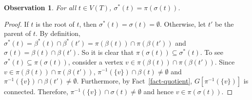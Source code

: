 \documentclass[a4paper,11pt]{article}
\numberwithin{lemma}{section}
\newtheorem{observation}[lemma]{Observation}
\begin{document}
\begin{observation} \label{obs-adhesion}
For all $t \in V(T)$, $\sigma^*(t) = \pi(\sigma(t))$.
\end{observation}
\begin{proof}
If $t$ is the root of $t$, then $\sigma^*(t) = \sigma(t) = \emptyset$.
Otherwise, let $t'$ be the parent of $t$.
By definition, $\sigma^*(t) = \beta^*(t) \cap \beta^*(t') = \pi(\beta(t)) \cap \pi(\beta(t'))$ and $\sigma(t) = \beta(t) \cap \beta(t')$.
So it is clear that $\pi(\sigma(t)) \subseteq \sigma^*(t)$.
To see $\sigma^*(t) \subseteq \pi(\sigma(t))$, consider a vertex $v \in \pi(\beta(t)) \cap \pi(\beta(t'))$.
Since $v \in \pi(\beta(t)) \cap \pi(\beta(t'))$, $\pi^{-1}(\{v\}) \cap \beta(t) \neq \emptyset$ and $\pi^{-1}(\{v\}) \cap \beta(t') \neq \emptyset$.
Furthermore, by Fact~\ref{fact-quotient}, $G[\pi^{-1}(\{v\})]$ is connected.
Therefore, $\pi^{-1}(\{v\}) \cap \sigma(t) \neq \emptyset$ and hence $v \in \pi(\sigma(t))$.
\end{proof}
\end{document}
